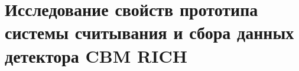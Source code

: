 \chapter{Исследование свойств прототипа системы считывания и сбора данных детектора CBM RICH}\label{sec:secAnalysisResults}









